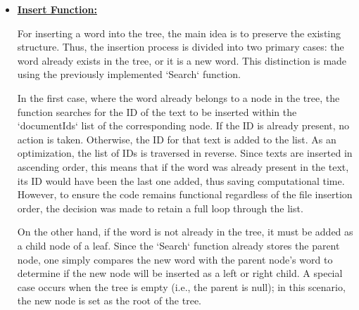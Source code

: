 \begin{itemize}
    \item \underline{\textbf{Insert Function:}}

    For inserting a word into the tree, the main idea is to preserve the existing structure. Thus, the insertion process is divided into two primary cases: the word already exists in the tree, or it is a new word. This distinction is made using the previously implemented `Search` function.

    In the first case, where the word already belongs to a node in the tree, the function searches for the ID of the text to be inserted within the `documentIds` list of the corresponding node. If the ID is already present, no action is taken. Otherwise, the ID for that text is added to the list. As an optimization, the list of IDs is traversed in reverse. Since texts are inserted in ascending order, this means that if the word was already present in the text, its ID would have been the last one added, thus saving computational time. However, to ensure the code remains functional regardless of the file insertion order, the decision was made to retain a full loop through the list.

    On the other hand, if the word is not already in the tree, it must be added as a child node of a leaf. Since the `Search` function already stores the parent node, one simply compares the new word with the parent node's word to determine if the new node will be inserted as a left or right child. A special case occurs when the tree is empty (i.e., the parent is null); in this scenario, the new node is set as the root of the tree.
    
\end{itemize}
